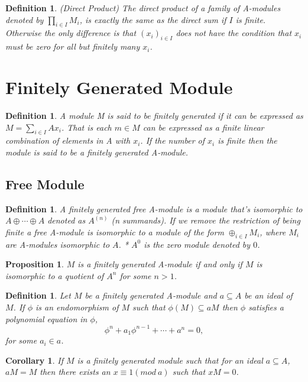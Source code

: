 \documentclass[]{report}
\newtheorem{prop}[theorem]{Proposition}
\newtheorem{corollary}{Corollary}[theorem]
\newtheorem{defn}[theorem]{Definition}
\begin{document}
\begin{defn} (Direct Product) The direct product of a family of A-modules denoted by $\prod_{i\in I} M_i$, is exactly the same as the direct sum if $I$ is finite. Otherwise the only difference is that $(x_i)_{i\in I}$ does not have the condition that $x_i$ must be zero for all but finitely many $x_i$.
\end{defn}


\section{Finitely Generated Module}

\begin{defn} A module M is said to be finitely generated if it can be expressed as $M = \sum_{i\in I} Ax_i$. That is each $m\in M$ can be expressed as a finite linear combination of elements in A with $x_i$. If the number of $x_i$ is finite then the module is said to be a finitely generated A-module. 
\end{defn}

\subsection{Free Module}

\begin{defn} A finitely generated free A-module is a module that's isomorphic to $A \oplus \cdots \oplus A$ denoted as $A^{(n)}$ (n summands). If we remove the restriction of being finite a free A-module is isomorphic to a module of the form $\oplus_{i\in I}M_i$, where $M_i$ are A-modules isomorphic to $A$. 
* $A^0$ is the zero module denoted by $0$. 
\end{defn}

\begin{prop} $M$ is a finitely generated A-module if and only if $M$ is isomorphic to a quotient of $A^n$ for some $n>1$. 
\end{prop}

\begin{defn} Let $M$ be a finitely generated A-module and $a\subseteq A$ be an ideal of $M$. If $\phi$ is an endomorphism of $M$ such that $\phi(M) \subseteq aM$ then $\phi$ satisfies a polynomial equation in $\phi$,
$$\phi^n + a_1 \phi^{n-1} + \cdots + a^n = 0,$$
for some $a_i \in a$. 
\end{defn}

\begin{corollary} If $M$ is a finitely generated module such that  for an ideal $a \subseteq A$, $aM = M$ then there exists an $x \equiv 1 ( mod\ a)$ such that $xM = 0$. 
\end{corollary}
\end{document}
